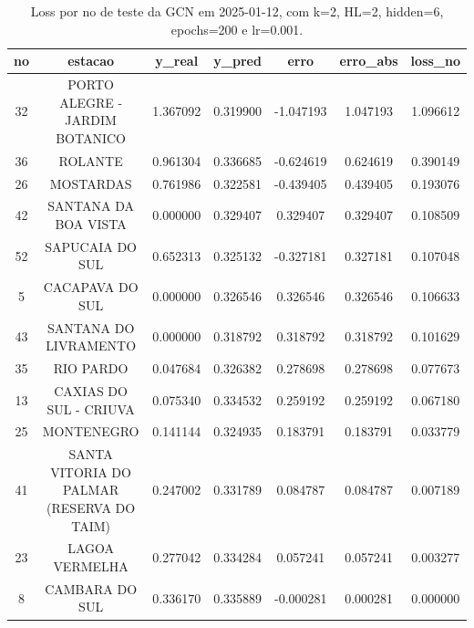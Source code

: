 \begin{table}[h]
\centering
\caption{Loss por no de teste da GCN em 2025-01-12, com k=2, HL=2, hidden=6, epochs=200 e lr=0.001.}
\label{tab:gcn_loss_k2_hl2_h6_e200_d20250112}
\begin{tabular}{ccccccc}
\toprule
no & estacao & y\_real & y\_pred & erro & erro\_abs & loss\_no \\
\midrule
32 & PORTO ALEGRE - JARDIM BOTANICO & 1.367092 & 0.319900 & -1.047193 & 1.047193 & 1.096612 \\
36 & ROLANTE & 0.961304 & 0.336685 & -0.624619 & 0.624619 & 0.390149 \\
26 & MOSTARDAS & 0.761986 & 0.322581 & -0.439405 & 0.439405 & 0.193076 \\
42 & SANTANA DA BOA VISTA & 0.000000 & 0.329407 & 0.329407 & 0.329407 & 0.108509 \\
52 & SAPUCAIA DO SUL & 0.652313 & 0.325132 & -0.327181 & 0.327181 & 0.107048 \\
5 & CACAPAVA DO SUL & 0.000000 & 0.326546 & 0.326546 & 0.326546 & 0.106633 \\
43 & SANTANA DO LIVRAMENTO & 0.000000 & 0.318792 & 0.318792 & 0.318792 & 0.101629 \\
35 & RIO PARDO & 0.047684 & 0.326382 & 0.278698 & 0.278698 & 0.077673 \\
13 & CAXIAS DO SUL - CRIUVA & 0.075340 & 0.334532 & 0.259192 & 0.259192 & 0.067180 \\
25 & MONTENEGRO & 0.141144 & 0.324935 & 0.183791 & 0.183791 & 0.033779 \\
41 & SANTA VITORIA DO PALMAR (RESERVA DO TAIM) & 0.247002 & 0.331789 & 0.084787 & 0.084787 & 0.007189 \\
23 & LAGOA VERMELHA & 0.277042 & 0.334284 & 0.057241 & 0.057241 & 0.003277 \\
8 & CAMBARA DO SUL & 0.336170 & 0.335889 & -0.000281 & 0.000281 & 0.000000 \\
\bottomrule
\end{tabular}
\end{table}

